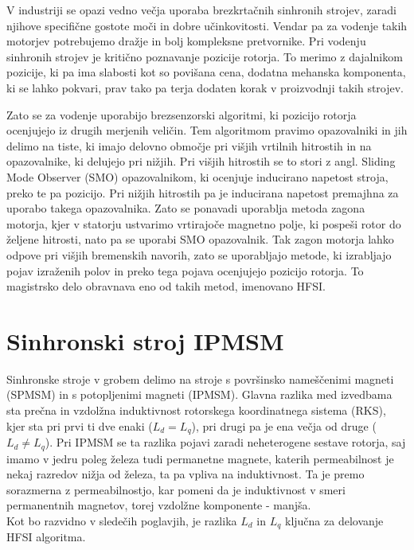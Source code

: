 \documentclass[a4paper,twoside,openright,12pt,slovene]{book}
\begin{document}
V industriji se opazi vedno večja uporaba brezkrtačnih sinhronih strojev, zaradi njihove specifične gostote moči in dobre učinkovitosti. Vendar pa za vodenje takih motorjev potrebujemo dražje in bolj
kompleksne pretvornike. Pri vodenju sinhronih strojev je kritično poznavanje pozicije rotorja. To merimo z dajalnikom pozicije, ki pa ima slabosti kot so povišana cena, dodatna mehanska komponenta, ki
se lahko pokvari, prav tako pa terja dodaten korak v proizvodnji takih strojev. 

Zato se za vodenje uporabijo brezsenzorski algoritmi, ki pozicijo rotorja ocenjujejo iz drugih merjenih veličin. Tem algoritmom pravimo opazovalniki in jih delimo na tiste, ki imajo delovno območje
pri višjih vrtilnih hitrostih in na opazovalnike, ki delujejo pri nižjih. Pri višjih hitrostih se to stori z angl. Sliding Mode Observer (SMO) opazovalnikom, ki ocenjuje inducirano napetost stroja, preko te pa pozicijo. Pri nižjih
hitrostih pa je inducirana napetost premajhna za uporabo takega opazovalnika. Zato se ponavadi uporablja metoda zagona motorja, kjer v statorju ustvarimo vrtirajoče magnetno polje, ki pospeši rotor do
željene hitrosti, nato pa se uporabi SMO opazovalnik. Tak zagon motorja lahko odpove pri višjih bremenskih navorih, zato se uporabljajo metode, ki izrabljajo pojav izraženih polov in preko tega pojava
ocenjujejo pozicijo rotorja. To magistrsko delo obravnava eno od takih metod, imenovano HFSI.


\chapter{Sinhronski stroj IPMSM} \label{sinhronskiStroj}

Sinhronske stroje v grobem delimo na stroje s površinsko nameščenimi magneti (SPMSM) in s potopljenimi magneti (IPMSM). Glavna razlika med izvedbama sta prečna in vzdolžna induktivnost rotorskega
koordinatnega sistema (RKS), kjer sta pri prvi ti dve enaki ($L_d = L_q$), pri drugi pa je ena večja od druge ($L_d \neq L_q$). Pri IPMSM se ta razlika pojavi zaradi neheterogene sestave rotorja, saj
imamo v jedru poleg železa tudi permanetne magnete, katerih permeabilnost je nekaj razredov nižja od železa, ta pa vpliva na induktivnost. Ta je premo sorazmerna z permeabilnostjo, kar pomeni da je
induktivnost v smeri permanentnih magnetov, torej vzdolžne komponente - manjša. 
\\
Kot bo razvidno v sledečih poglavjih, je razlika $L_d$ in $L_q$ ključna za delovanje HFSI algoritma. 
\end{document}
